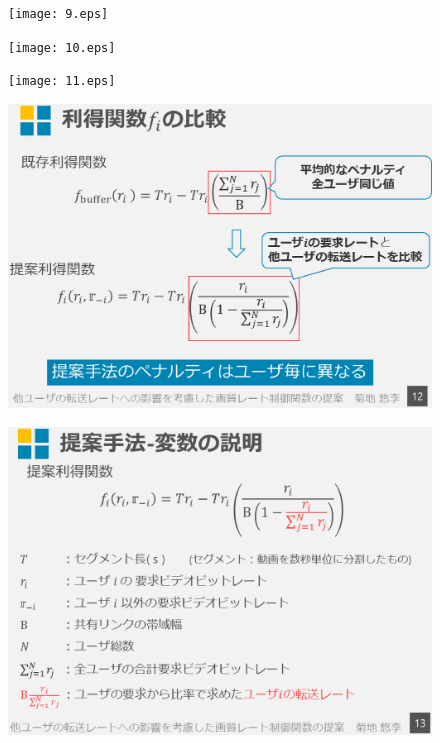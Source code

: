 \documentclass[a4paper,12pt,report]{jsbook}
\begin{document}
\begin{figure}[tp]
  \centering
  \texttt{[image: 9.eps]}
\end{figure}

\begin{figure}[tb]
  \centering
  \texttt{[image: 10.eps]}
\end{figure}

\begin{figure}[tp]
  \centering
  \texttt{[image: 11.eps]}
\end{figure}

\begin{figure}[tb]
  \centering
  \includegraphics[scale=0.45]{12.eps}
\end{figure}

\begin{figure}[tp]
  \centering
  \includegraphics[scale=0.45]{13.eps}
\end{figure}
\end{document}
